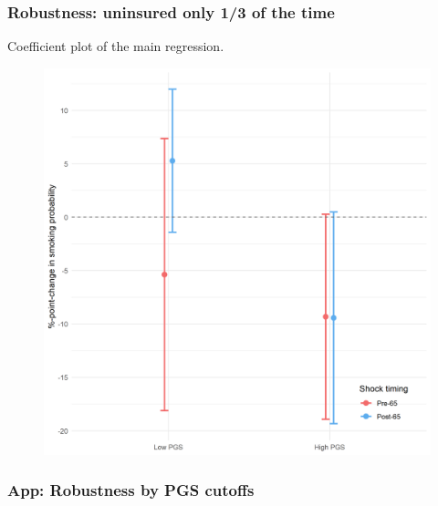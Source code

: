 \documentclass[10pt,compress,xcolor=dvipsnames]{beamer}    %
\newcounter{ex}
\newcommand{\1}[1]{\mathrm{1\hspace*{-2.5pt}l}[#1]}	%
\begin{document}
\begin{frame}
\frametitle{Robustness: uninsured only 1/3 of the time}
Coefficient plot of the main regression.
\begin{figure}[hbtp]
\centering
\includegraphics[height=0.8\textheight]{../../3_output/shock_effects/robustness_607033_cvplot.png}
\label{fig:coeffplot33unins}
\end{figure}
\hyperlink{frame:robustness}{}
\end{frame}

\subsubsection{App: Robustness by PGS cutoffs}
\end{document}
